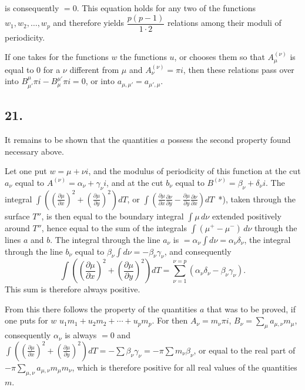 \documentclass{article}
\begin{document}
is consequently $= 0$. This equation holds for any two of the functions $w_{1}, w_{2}, \ldots, w_{p}$ and therefore yields $\dfrac{p(p-1)}{1 \cdot 2}$ relations among their moduli of periodicity.

If one takes for the functions $w$ the functions $u$, or chooses them so that $A_{\mu}^{(\nu)}$ is equal to 0 for a $\nu$ different from $\mu$ and $A_{\nu}^{(\nu)} = \pi i$, then these relations pass over into $B_{\mu'}^{\mu} \pi i - B_{\mu}^{\mu'} \pi i = 0$, or into $a_{\mu,\mu'} = a_{\mu',\mu}$.

\subsection*{21.}

It remains to be shown that the quantities $a$ possess the second property found necessary above.

Let one put $w = \mu + \nu i$, and the modulus of periodicity of this function at the cut $a_{\nu}$ equal to $A^{(\nu)} = \alpha_{\nu} + \gamma_{\nu} i$, and at the cut $b_{\nu}$ equal to $B^{(\nu)} = \beta_{\nu} + \delta_{\nu} i$. The integral $\displaystyle\int \left(\left(\frac{\partial\mu}{\partial x}\right)^{2} + \left(\frac{\partial\mu}{\partial y}\right)^{2}\right) dT$, or $\displaystyle\int \left(\frac{\partial\mu}{\partial x}\frac{\partial\nu}{\partial y} - \frac{\partial\mu}{\partial y}\frac{\partial\nu}{\partial x}\right) dT$~*), taken through the surface $T''$, is then equal to the boundary integral $\displaystyle\int \mu\, d\nu$ extended positively around $T''$, hence equal to the sum of the integrals $\displaystyle\int (\mu^{+} - \mu^{-})\, d\nu$ through the lines $a$ and $b$. The integral through the line $a_{\nu}$ is $= \alpha_{\nu} \displaystyle\int d\nu = \alpha_{\nu}\delta_{\nu}$, the integral through the line $b_{\nu}$ equal to $\beta_{\nu} \displaystyle\int d\nu = -\beta_{\nu}\gamma_{\nu}$, and consequently
\[ \int \left(\left(\frac{\partial\mu}{\partial x}\right)^{2} + \left(\frac{\partial\mu}{\partial y}\right)^{2}\right) dT = \sum_{\nu=1}^{\nu=p} (\alpha_{\nu}\delta_{\nu} - \beta_{\nu}\gamma_{\nu}). \]
This sum is therefore always positive.

From this there follows the property of the quantities $a$ that was to be proved, if one puts for $w$ $u_{1}m_{1} + u_{2}m_{2} + \cdots + u_{p}m_{p}$. For then $A_{\nu} = m_{\nu}\pi i$, $B_{\nu} = \displaystyle\sum_{\mu} a_{\mu,\nu} m_{\mu}$, consequently $\alpha_{\nu}$ is always $= 0$ and $\displaystyle\int \left(\left(\frac{\partial\mu}{\partial x}\right)^{2} + \left(\frac{\partial\mu}{\partial y}\right)^{2}\right) dT = -\sum \beta_{\nu}\gamma_{\nu} = -\pi \sum m_{\nu}\beta_{\nu}$, or equal to the real part of $-\pi \displaystyle\sum_{\mu,\nu} a_{\mu,\nu} m_{\mu} m_{\nu}$, which is therefore positive for all real values of the quantities $m$.
\end{document}
